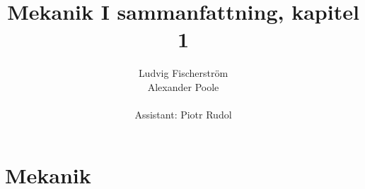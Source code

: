 \documentclass[a4paper,12pt]{article}
\title{Mekanik I sammanfattning, kapitel 1}
\author{Ludvig Fischerstr\"{o}m \\Alexander Poole\\ \\Assistant: Piotr Rudol}
\begin{document}
\section{Mekanik}
\end{document}
